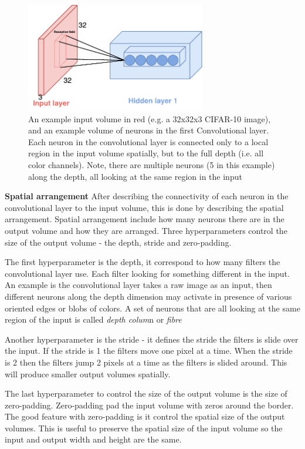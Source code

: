 \begin{figure}[H]
	\centering
	\includegraphics[width=0.7\textwidth]{Figures/Respective_field.pdf}
	\caption{An example input volume in red (e.g. a 32x32x3 CIFAR-10 image), and an example volume of neurons in the first Convolutional layer. Each neuron in the convolutional layer is connected only to a local region in the input volume spatially, but to the full depth (i.e. all color channels). Note, there are multiple neurons (5 in this example) along the depth, all looking at the same region in the input \cite{CNN_course}}
	\label{fig:Respective_field}
\end{figure}

\textbf{Spatial arrangement}
After describing the connectivity of each neuron in the convolutional layer to the input volume, this is done by describing the spatial arrangement. Spatial arrangement include how many neurons there are in the output volume and how they are arranged. Three hyperparameters control the size of the output volume - the depth, stride and zero-padding. 

The first hyperparameter is the depth, it correspond to how many filters the convolutional layer use. Each filter looking for something different in the input. An example is the convolutional layer takes a raw image as an input, then different neurons along the depth dimension may activate in presence of various oriented edges or blobs of colors. A set of neurons that are all looking at the same region of the input is called \textit{depth colum}n or \textit{fibre}

Another hyperparameter is the stride - it defines the stride the filters is slide over the input. If the stride is 1 the filters move one pixel at a time. When the stride is 2 then the filters jump 2 pixels at a time as the filters is slided around. This will produce smaller output volumes spatially.

The last hyperparameter to control the size of the output volume is the size of zero-padding. Zero-padding pad the input volume with zeros around the border. The good feature with zero-padding is it control the spatial size of the output volumes. This is useful to preserve the spatial size of the input volume so the input and output width and height are the same. 

